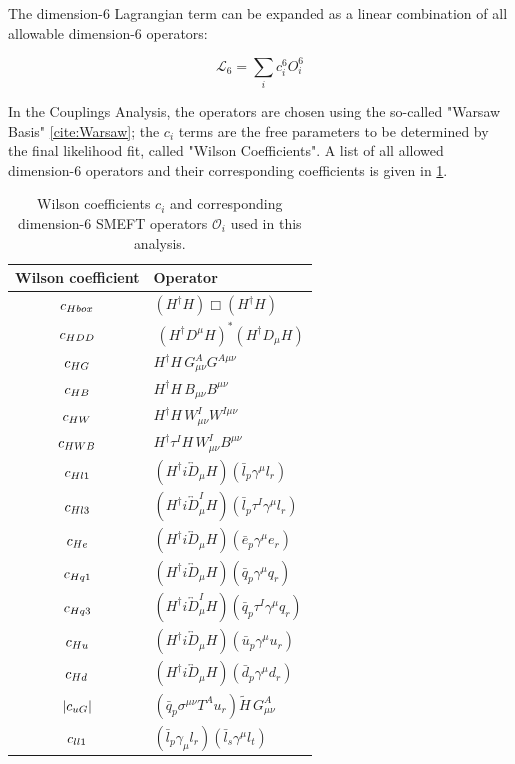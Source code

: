 The dimension-6 Lagrangian term can be expanded as a linear combination of all allowable dimension-6 operators:

\begin{equation}
\mathcal{L}_{6} = \sum_{i} c_{i}^6 O_{i}^{6}
\end{equation}

In the Couplings Analysis, the operators are chosen using the so-called "Warsaw Basis" \ref{cite:Warsaw}; the $c_{i}$ terms are the free parameters to be determined by the final likelihood fit, called "Wilson Coefficients". A list of all allowed dimension-6 operators and their corresponding coefficients is given in \ref{tab:EFT}.

\begin{table}
  \centering
  \begin{tabular}{c l}
  \hline
  Wilson coefficient & Operator \\
  \hline
  $c_{Hbox}$ & $(H^\dag H)\Box(H^\dag H)$\\
  $c_{HDD}$   & $\ \left(H^\dag D^\mu H\right)^* \left(H^\dag D_\mu H\right)$\\
  $c_{HG}$  & $H^\dag H\, G^A_{\mu\nu} G^{A\mu\nu}$  \\
  $c_{HB}$ &  $ H^\dag H\, B_{\mu\nu} B^{\mu\nu}$\\
  $c_{HW}$ &  $H^\dag H\, W^I_{\mu\nu} W^{I\mu\nu}$\\
  $c_{HWB}$ &  $ H^\dag \tau^I H\, W^I_{\mu\nu} B^{\mu\nu}$\\
  $c_{Hl1}$ & $(H^\dag i\overleftrightarrow{D}_\mu H)(\bar l_p \gamma^\mu l_r)$\\
  $c_{Hl3}$ & $(H^\dag i\overleftrightarrow{D}^I_\mu H)(\bar l_p \tau^I \gamma^\mu l_r)$\\
  $c_{He}$  & $(H^\dag i\overleftrightarrow{D}_\mu H)(\bar e_p \gamma^\mu e_r)$\\
  $c_{Hq1}$ & $(H^\dag i\overleftrightarrow{D}_\mu H)(\bar q_p \gamma^\mu q_r)$\\
  $c_{Hq3}$ & $(H^\dag i\overleftrightarrow{D}^I_\mu H)(\bar q_p \tau^I \gamma^\mu q_r)$\\
  $c_{Hu}$  & $(H^\dag i\overleftrightarrow{D}_\mu H)(\bar u_p \gamma^\mu u_r)$\\
  $c_{Hd}$  & $(H^\dag i\overleftrightarrow{D}_\mu H)(\bar d_p \gamma^\mu d_r)$\\
  $|c_{uG}|$ & $(\bar q_p \sigma^{\mu\nu} T^A u_r) \widetilde H \, G_{\mu\nu}^A$ \\
  $c_{ll1}$   & $(\bar l_p \gamma_\mu l_r)(\bar l_s \gamma^\mu l_t)$ \\
  \hline
\end{tabular}
  \caption{Wilson coefficients $c_i$ and corresponding dimension-6 SMEFT operators $\mathcal{O}_i$ used in this analysis.}
  \label{tab:EFT}
\end{table}

